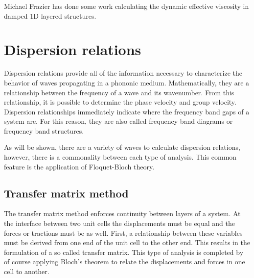 \documentclass{article}
\begin{document}
Michael Frazier has done some work calculating the dynamic effective viscosity 
in damped 1D layered structures.

\section{Dispersion relations}
Dispersion relations provide all of the information necessary to characterize 
the behavior of waves propagating in a phononic medium. Mathematically, they 
are a relationship between the frequency of a wave and its wavenumber. From 
this relationship, it is possible to determine the phase velocity and group 
velocity. Dispersion relationships immediately indicate where the frequency 
band gaps of a system are. For this reason, they are also called frequency band 
diagrams or frequency band structures.

As will be shown, there are a variety of waves to calculate dispersion 
relations, however, there is a commonality between each type of analysis. This 
common feature is the application of Floquet-Bloch theory.

\subsection{Transfer matrix method}
The transfer matrix method enforces continuity between layers of a system. At 
the interface between two unit cells the displacements must be equal and the 
forces or tractions must be as well. First, a relationship between these 
variables must be derived from one end of the unit cell to the other end. This 
results in the formulation of a so called transfer matrix. This type of 
analysis is completed by of course applying Bloch's theorem to relate the 
displacements and forces in one cell to another.
\end{document}
